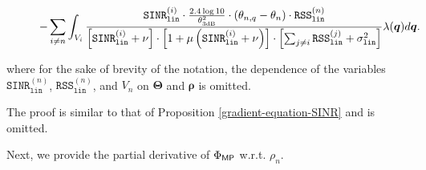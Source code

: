 \begin{Proposition}
\begin{figure*}[t!]
\begin{multline}
    - \sum_{i\neq n}   \int_{V_i }  \frac{\mathtt{SINR}^{(i)}_{\mathtt{lin}} \cdot \frac{2.4 \log 10}{\theta^2_{\text{3dB}}} \cdot \left(\theta_{n,q} - \theta_n \right)\cdot \mathtt{RSS}^{(n)}_{\mathtt{lin}}  }{\left[\mathtt{SINR}^{(i)}_{\mathtt{lin}} + \nu \right] \cdot 
    \left[ 1 + \mu \left( \mathtt{SINR}^{(i)}_{\mathtt{lin}} + \nu \right) \right] \cdot \left[ {\sum_{j\neq i}^{} \mathtt{RSS}^{(j)}_{\mathtt{lin}}  + \sigma^2_{\mathtt{lin}}} \right] }   \lambda(\bm{q})d\bm{q}.  
\end{multline}   
\end{figure*}
where for the sake of brevity of the notation, the dependence of the variables $\mathtt{SINR}_{\mathtt{lin}}^{(n)}$, $\mathtt{RSS}_{\mathtt{lin}}^{(n)}$, and $V_n$ on $\bm{\Theta}$ and $\bm{\rho}$ is omitted.
\end{Proposition}
\noindent The proof is similar to that of Proposition \ref{gradient-equation-SINR} and is omitted.



Next, we provide the partial derivative of $\Phi_{{\sf MP}}$ w.r.t. $\rho_n$.

